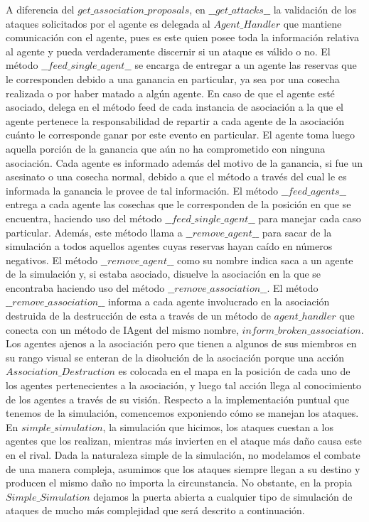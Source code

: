 \documentclass[11pt]{article}
\begin{document}
A diferencia del $get\_association\_proposals$, en $\_\_get\_attacks\_\_$ la validación de los ataques solicitados por el agente es delegada al $Agent\_Handler$ que mantiene comunicación con el agente, pues es este quien posee toda la información relativa al agente y pueda verdaderamente discernir si un ataque es válido o no.
El método $\_\_feed\_single\_agent\_\_$ se encarga de entregar a un agente las reservas que le corresponden debido a una ganancia en particular, ya sea por una cosecha realizada o por haber matado a algún agente. En caso de que el agente esté asociado, delega en el método feed de cada instancia de asociación a la que el agente pertenece la responsabilidad de repartir a cada agente de la asociación cuánto le corresponde ganar por este evento en particular. El agente toma luego aquella porción de la ganancia que aún no ha comprometido con ninguna asociación. Cada agente es informado además del motivo de la ganancia, si fue un asesinato o una cosecha normal, debido a que el método a través del cual le es informada la ganancia le provee de tal información.
El método $\_\_feed\_agents\_\_$ entrega a cada agente las cosechas que le corresponden de la posición en que se encuentra, haciendo uso del método $\_\_feed\_single\_agent\_\_$ para manejar cada caso particular. Además, este método llama a $\_\_remove\_agent\_\_$ para sacar de la simulación a todos aquellos agentes cuyas reservas hayan caído en números negativos.
El método $\_\_remove\_agent\_\_$ como su nombre indica saca a un agente de la simulación y, si estaba asociado, disuelve la asociación en la que se encontraba haciendo uso del método $\_\_remove\_association\_\_$.
El método $\_\_remove\_association\_\_$ informa a cada agente involucrado en la asociación destruida de la destrucción de esta a través de un método de $agent\_handler$ que conecta con un método de IAgent del mismo nombre, $inform\_broken\_association$. Los agentes ajenos a la asociación pero que tienen a algunos de sus miembros en su rango visual se enteran de la disolución de la asociación porque una acción $Association\_Destruction$ es colocada en el mapa en la posición de cada uno de los agentes pertenecientes a la asociación, y luego tal acción llega al conocimiento de los agentes a través de su visión.
Respecto a la implementación puntual que tenemos de la simulación, comencemos exponiendo cómo se manejan los ataques.
En $simple\_simulation$, la simulación que hicimos, los ataques cuestan a los agentes que los realizan, mientras más invierten en el ataque más daño causa este en el rival. Dada la naturaleza simple de la simulación, no modelamos el combate de una manera compleja, asumimos que los ataques siempre llegan a su destino y producen el mismo daño no importa la circunstancia. No obstante, en la propia $Simple\_Simulation$ dejamos la puerta abierta a cualquier tipo de simulación de ataques de mucho más complejidad que será descrito a continuación.
\end{document}
